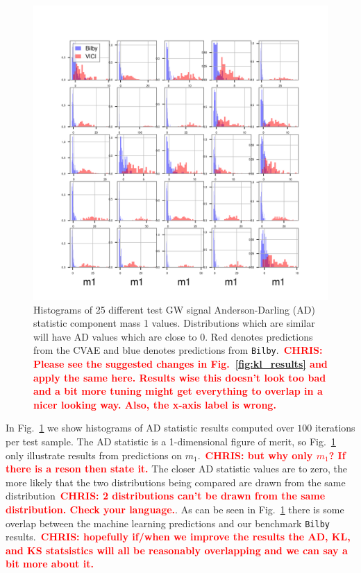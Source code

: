 \documentclass[%
showpacs,
 amsmath,amssymb,
 aps,
 twocolumn,
 prl,
 reprint,
floatfix,
]{revtex4-1}
\newcommand{\chris}[1]{\textbf{\textcolor{red}{CHRIS: #1}}}
\begin{document}
%
%
\begin{figure}
    \includegraphics[width=\columnwidth]{images/hist-ad_0.png}
    \caption{\label{fig:ad_results} Histograms of 25 different test GW signal
Anderson-Darling (AD) statistic component mass 1 values. Distributions which
are similar will have AD values which are close to 0.  Red denotes predictions
from the \ac{CVAE} and blue denotes predictions from
\texttt{Bilby}.~\chris{Please see the suggested changes in
Fig.~\ref{fig:kl_results} and apply the same here. Results wise this doesn't
look too bad and a bit more tuning might get everything to overlap in a nicer
looking way. Also, the x-axis label is wrong.}}
\end{figure}
%
In Fig.~\ref{fig:ad_results} we show histograms of \ac{AD} statistic results
computed over $100$ iterations per test sample.  The \ac{AD} statistic is a
1-dimensional figure of merit, so Fig.~\ref{fig:ad_results} only illustrate
results from predictions on $m_1$.~\chris{but why only $m_{1}$? If there is a
reson then state it.} The closer \ac{AD} statistic values are to zero, the more
likely that the two distributions being compared are drawn from the same
distribution~\chris{2 distributions can't be drawn from the same distribution.
Check your language.}. As can be seen in Fig.~\ref{fig:ad_results} there is
some overlap between the machine learning predictions and our benchmark
\texttt{Bilby} results.~\chris{hopefully if/when we improve the results the AD,
KL, and KS statsistics will all be reasonably overlapping and we can say a bit
more about it.}
\end{document}
